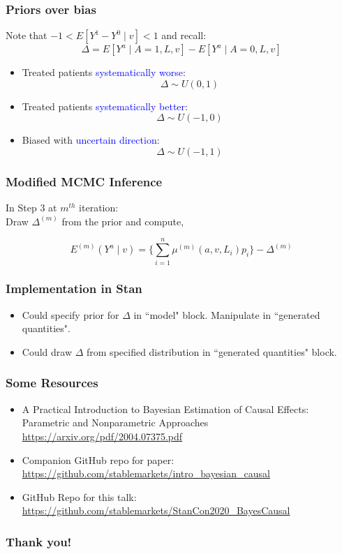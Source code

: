 \documentclass[xcolor=x11names,compress]{beamer}
\renewcommand{\(}{\begin{columns}}
\renewcommand{\)}{\end{columns}}
\newcommand{\<}[1]{\begin{column}{#1}}
\renewcommand{\>}{\end{column}}
\begin{document}
\begin{frame}
	\frametitle{Priors over bias}
	Note that $-1 < E[Y^1 - Y^0 \mid v ] < 1$ and recall:
	$$\Delta  = E[Y^a \mid A=1, L, v] - E[Y^a \mid A=0, L, v] $$
	
	\begin{itemize}
		 
		\item Treated patients \textcolor{blue}{systematically worse}:
		$$ \Delta \sim U(0, 1) $$
		
		 
		\item Treated patients \textcolor{blue}{systematically better}:
		$$ \Delta \sim U(-1, 0) $$
		
		 
		\item Biased with \textcolor{blue}{uncertain direction}:
		$$ \Delta \sim U(-1,1) $$		
	\end{itemize}
\end{frame}

\begin{frame}
	\frametitle{Modified MCMC Inference}

	In Step 3 at $m^{th}$ iteration: \\


	Draw $\Delta^{(m)}$ from the prior and compute, 
	
	$$ E^{(m)}(Y^a \mid v ) =  \Big\{ \sum_{i=1}^n \mu^{(m)}( a, v, L_i ) p_i \Big\} - \Delta^{(m)} $$

\end{frame}

\begin{frame}
	\frametitle{Implementation in Stan}

	\begin{itemize}
		\item Could specify prior for $\Delta$ in ``model" block. Manipulate in ``generated quantities".
		\item Could draw $\Delta$ from specified distribution in ``generated quantities" block.
	\end{itemize}
\end{frame}

\begin{frame}
	\frametitle{Some Resources}

	\begin{itemize}
		\item A Practical Introduction to Bayesian Estimation of Causal Effects: Parametric and Nonparametric Approaches
		\url{https://arxiv.org/pdf/2004.07375.pdf}
		\item Companion GitHub repo for paper:
		\url{https://github.com/stablemarkets/intro_bayesian_causal}
		\item GitHub Repo for this talk:
		\url{https://github.com/stablemarkets/StanCon2020_BayesCausal}
	\end{itemize}
\end{frame}

\begin{frame}
	\frametitle{Thank you!}

\end{frame}
\end{document}
